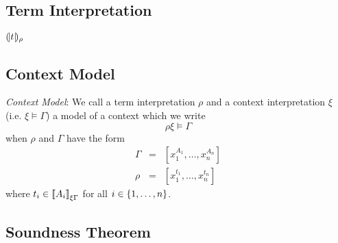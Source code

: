 \subsection{Term Interpretation}

${(\!|t|\!)_{\rho}}$







\subsection{Context Model}

\begin{definition}
    \label{DefinitionContextModel}
    \emph{Context Model}: We call a term interpretation $\rho$ and a context
    interpretation $\xi$ (i.e. $\xi \vDash \Gamma$) a model of a context which
    we write
    $$
        \rho\xi \vDash \Gamma
    $$
    when
    $\rho$ and $\Gamma$ have the form
    $$
    \begin{array}{lll}
        \Gamma &=& [x_1^{A_1}, \ldots, x_n^{A_n}]
        \\
        \rho   &=& [x_1^{t_1}, \ldots, x_n^{t_n}]
    \end{array}
    $$
    where $t_i \in {{[\![}A_i{]\!]}}_{\xi\Gamma}$ for all $i \in {\{1,\ldots,n\}}$.
\end{definition}




\subsection{Soundness Theorem}

